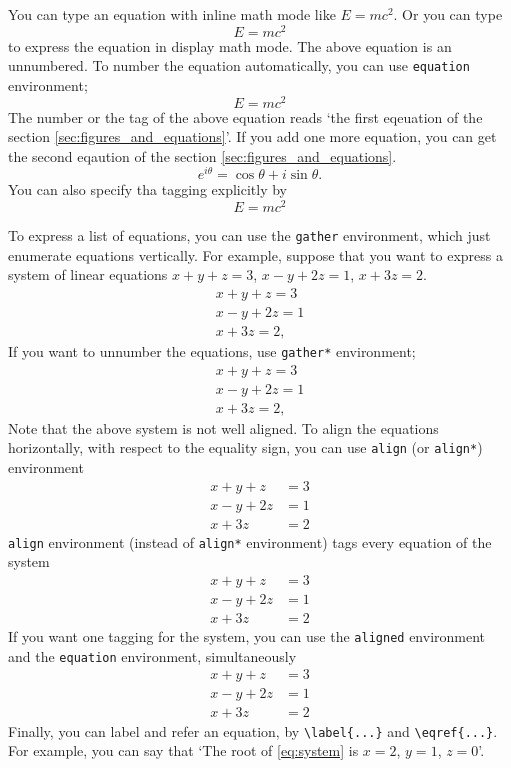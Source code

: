 \documentclass[11pt]{report}
\theoremstyle{plain}
\theoremstyle{definition}
\theoremstyle{corollary}
\theoremstyle{definition}
\theoremstyle{plain}
\theoremstyle{definition}
\theoremstyle{plain}
\begin{document}
You can type an equation with inline math mode like \(E=mc^2\). %
Or you can type
\[E=mc^2\]
to express the equation in display math mode.
The above equation is an unnumbered.
To number the equation automatically, you can use \texttt{equation} environment;
\begin{equation}
E=mc^2
\end{equation}
The number or the tag of the above equation reads `the first eqeuation of the section \ref{sec:figures_and_equations}'.
If you add one more equation, you can get the second eqaution of the section \ref{sec:figures_and_equations}.
\begin{equation}
e^{i\theta}=\cos\theta+i\sin\theta.
\end{equation}
You can also specify tha tagging explicitly by
\[E=mc^2\tag{$*$}\]

To express a list of equations, you can use the \texttt{gather} environment, which just enumerate equations vertically.
For example, suppose that you want to express a system of linear equations \(x+y+z=3\), \(x-y+2z=1\), \(x+3z=2\).
\begin{gather}
x+y+z=3\\
x-y+2z=1\\
x+3z=2,
\end{gather}
If you want to unnumber the equations, use \texttt{gather*} environment;
\begin{gather*}
x+y+z=3\\
x-y+2z=1\\
x+3z=2,
\end{gather*}
Note that the above system is not well aligned.
To align the equations horizontally, with respect to the equality sign, you can use \texttt{align} (or \texttt{align*}) environment
\begin{align*}
x+y+z&=3\\
x-y+2z&=1\\
x+3z&=2
\end{align*}
\texttt{align} environment (instead of \texttt{align*} environment) tags every equation of the system
\begin{align}
x+y+z&=3\\
x-y+2z&=1\\
x+3z&=2
\end{align}
If you want one tagging for the system, you can use the \texttt{aligned} environment and the \texttt{equation} environment, simultaneously
\begin{equation}\label{eq:system}
\begin{aligned}
x+y+z&=3\\
x-y+2z&=1\\
x+3z&=2
\end{aligned}
\end{equation}
Finally, you can label and refer an equation, by \verb|\label{...}| and \verb|\eqref{...}|.
For example, you can say that `The root of \eqref{eq:system} is \(x=2\), \(y=1\), \(z=0\)'.
\end{document}
